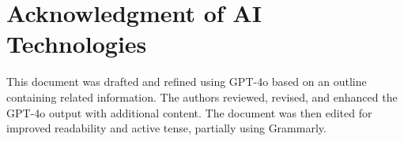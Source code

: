 \documentclass[a4paper,12pt]{article}
\begin{document}
\section{Acknowledgment of AI Technologies}
	This document was drafted and refined using GPT-4o based on an outline containing related information. The authors reviewed, revised, and enhanced the GPT-4o output with additional content. The document was then edited for improved readability and active tense, partially using Grammarly.
\end{document}
